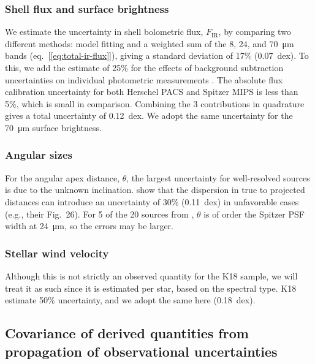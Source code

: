 \subsubsection{Shell flux and surface brightness}
\label{sec:shell-flux-surface}

We estimate the uncertainty in shell bolometric flux,
\(F_{\text{IR}}\), by comparing two different methods: model fitting
\citep{Kobulnicky:2017a} and a weighted sum of the 8, 24, and
\SI{70}{\um} bands (eq.~[\ref{eq:total-ir-flux}]), giving a standard
deviation of 17\% (0.07~dex).  To this, we add the estimate of 25\%
for the effects of background subtraction uncertainties on individual
photometric measurements \citep{Kobulnicky:2017a}. The absolute flux
calibration uncertainty for both Herschel PACS \citep{Balog:2014a} and
Spitzer MIPS \citep{Engelbracht:2007a} is less than 5\%, which is
small in comparison. Combining the 3 contributions in quadrature gives
a total uncertainty of 0.12~dex.  We adopt the same uncertainty for
the \SI{70}{\um} surface brightness.

\subsubsection{Angular sizes}
\label{sec:angular-sizes}

For the angular apex distance, \(\theta\), the largest uncertainty for
well-resolved sources is due to the unknown inclination.
\citet{Tarango-Yong:2018a} show that the dispersion in true to
projected distances can introduce an uncertainty of \(30\%\)
(0.11~dex) in unfavorable cases (e.g., their Fig.~26).  For 5 of the
20 sources from \citet{Kobulnicky:2018a}, \(\theta\) is of order the
Spitzer PSF width at \SI{24}{\um}, so the errors may be larger.

\subsubsection{Stellar wind velocity}
\label{sec:stell-wind-veloc}

Although this is not strictly an observed quantity for the K18 sample,
we will treat it as such since it is estimated per star, based on the
spectral type.  K18 estimate 50\% uncertainty, and we adopt the same
here (0.18~dex).

\subsection{Covariance of derived quantities from propagation of observational uncertainties}
\label{sec:comb-uncert-covar}

